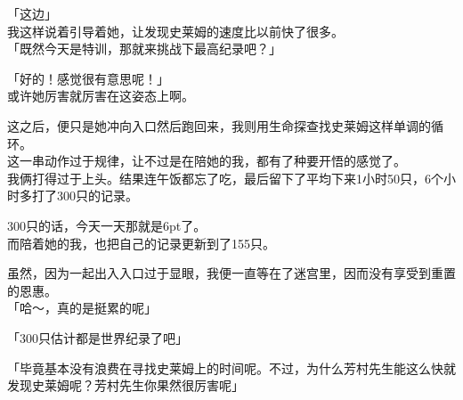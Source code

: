 「这边」\\

我这样说着引导着她，让发现史莱姆的速度比以前快了很多。\\

「既然今天是特训，那就来挑战下最高纪录吧？」

「好的！感觉很有意思呢！」\\

或许她厉害就厉害在这姿态上啊。

这之后，便只是她冲向入口然后跑回来，我则用生命探查找史莱姆这样单调的循环。\\

这一串动作过于规律，让不过是在陪她的我，都有了种要开悟的感觉了。\\

我俩打得过于上头。结果连午饭都忘了吃，最后留下了平均下来1小时50只，6个小时多打了300只的记录。

300只的话，今天一天那就是6pt了。\\

而陪着她的我，也把自己的记录更新到了155只。

虽然，因为一起出入入口过于显眼，我便一直等在了迷宫里，因而没有享受到重置的恩惠。\\

「哈～，真的是挺累的呢」

「300只估计都是世界纪录了吧」

「毕竟基本没有浪费在寻找史莱姆上的时间呢。不过，为什么芳村先生能这么快就发现史莱姆呢？芳村先生你果然很厉害呢」

